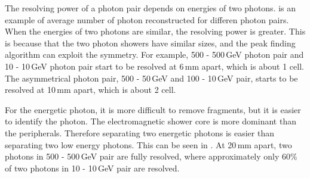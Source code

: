 The resolving power of a photon pair depends on energies of two photons.  is an example of average number of photon reconstructed for differen photon pairs. When the energies of two photons are similar, the resolving power is greater. This is because that the two photon showers have similar sizes, and the peak finding algorithm can exploit the symmetry. For example, 500 - 500\,GeV photon pair and 10 - 10\,GeV photon pair start to be resolved at 6\,mm apart, which is about 1 \ECAL cell. The asymmetrical photon pair,  500 - 50\,GeV and  100 - 10\,GeV pair, starts to be resolved at 10\,mm apart, which is about 2 \ECAL cell.

For the energetic photon, it is more difficult to remove fragments, but it is easier to identify the photon. The electromagnetic shower core is more dominant than the peripherals. Therefore separating two energetic photons is easier than separating two low energy photons. This can be seen in . At 20\,mm apart, two photons in  500 - 500\,GeV pair are fully resolved, where approximately only 60\% of two photons in 10 - 10\,GeV pair are resolved.

